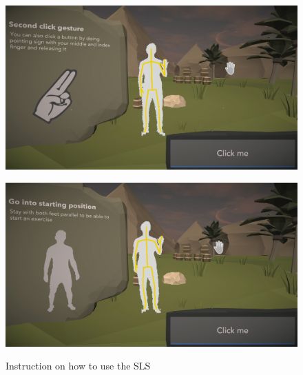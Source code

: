 \begin{figure}[htb]
\begin{minipage}[t]{0.49\linewidth}
		\label{fig:5_3_tutHandPush}
	\end{minipage}
	\hfill
	\begin{minipage}[t]{0.49\linewidth}
		\centering
		\includegraphics[width=1\linewidth]{Pictures/5_Workflow/3_TutHandClick}
		\label{fig:5_3_tutHandPoint}
	\end{minipage}
	\hfill
	\begin{minipage}[t]{0.49\linewidth}
		\centering
		\includegraphics[width=1\linewidth]{Pictures/5_Workflow/4_2_StartingPosition}
		\label{fig:5_3_standingPosition}
	\end{minipage}
	\caption{Instruction on how to use the SLS}
	\label{fig:5_3_tutorials}
\end{figure}

